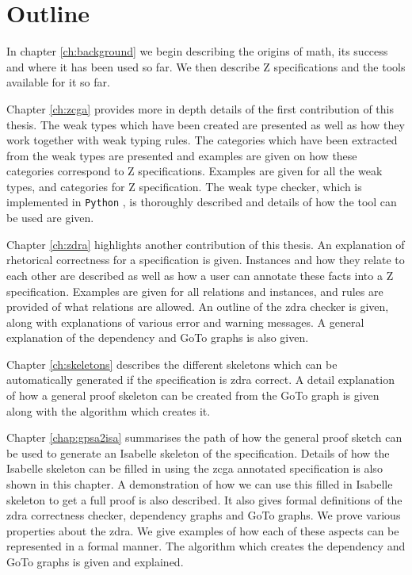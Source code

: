 \section{Outline}

In chapter \ref{ch:background} we begin describing the origins of \gls{math},
its success and where it has been used so far. We then describe Z specifications
and the tools available for it so far.


Chapter \ref{ch:zcga} provides more in depth details of the first contribution
of this thesis. The weak types which have been created are presented as well as
how they work together with weak typing rules. The categories which have been
extracted from the weak types are presented and examples are given on how these
categories correspond to Z specifications. Examples are given for all the weak
types, and categories for Z specification. The weak type checker, which is
implemented in \texttt{Python} \cite{Python}, is thoroughly described and
details of how the tool can be used are given.

Chapter \ref{ch:zdra} highlights another contribution of this thesis. An
explanation of rhetorical correctness for a specification is given. Instances
and how they relate to each other are described as well as how a user can
annotate these facts into a Z specification. Examples are given for all
relations and instances, and rules are provided of what relations are allowed.
An outline of the \gls{zdra} checker is given, along with explanations of
various error and warning messages. A general explanation of the dependency and
GoTo graphs is also given.

Chapter \ref{ch:skeletons} describes the different skeletons which can be
automatically generated if the specification is \gls{zdra} correct. A detail
explanation of how a general proof skeleton can be created from the GoTo graph
is given along with the algorithm which creates it. 

Chapter \ref{chap:gpsa2isa} summarises the path of how the general proof sketch
can be used to generate an Isabelle skeleton of the specification. Details of
how the Isabelle skeleton can be filled in using the \gls{zcga} annotated
specification is also shown in this chapter. A demonstration of how we can use
this filled in Isabelle skeleton to get a full proof is also described. It also
gives formal definitions of the \gls{zdra} correctness checker, dependency
graphs and GoTo graphs. We prove various properties about the \gls{zdra}. We
give examples of how each of these aspects can be represented in a formal
manner. The algorithm which creates the dependency and GoTo graphs is given and
explained.

